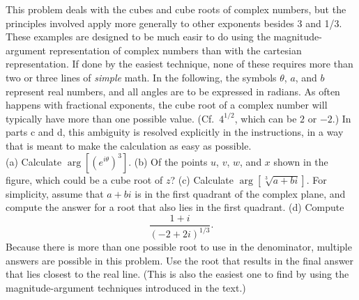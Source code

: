 This problem deals with the cubes and cube roots of complex numbers, but the principles
involved apply more generally to other exponents besides 3 and 1/3. These examples
are designed to be much easir to do using the magnitude-argument representation
of complex numbers than with the cartesian representation. If done by the easiest technique,
none of these requires more than two or three lines of \emph{simple} math.
In the following, the
symbols $\theta$, $a$, and $b$ represent real numbers, and all angles are to be expressed in radians.
As often happens with fractional exponents, the cube root of a complex number will typically have
more than one possible value. (Cf.~$4^{1/2}$, which can be $2$ or $-2$.) In parts c and d,
this ambiguity is resolved explicitly in the instructions, in a way that is meant to make
the calculation as easy as possible.\\
(a) Calculate $\arg\left[(e^{i\theta})^3\right]$.\answercheck\hwendpart
(b) Of the points $u$, $v$, $w$, and $x$ shown in the figure, which could be
a cube root of $z$?\hwendpart
(c) Calculate $\arg\left[\sqrt[3]{a+bi}\right]$. For simplicity, assume that
$a+bi$ is in the first quadrant of the complex plane, and compute the answer
for a root that also lies in the first quadrant.\answercheck\hwendpart
(d) Compute
\begin{equation*}
  \frac{1+i}{(-2+2i)^{1/3}}.
\end{equation*}
Because there is more than one possible root to use in the denominator, multiple
answers are possible in this problem. Use the root that results in the final answer
that lies closest to the real line. (This is
also the easiest one to find by using the magnitude-argument techniques
introduced in the text.)\answercheck

